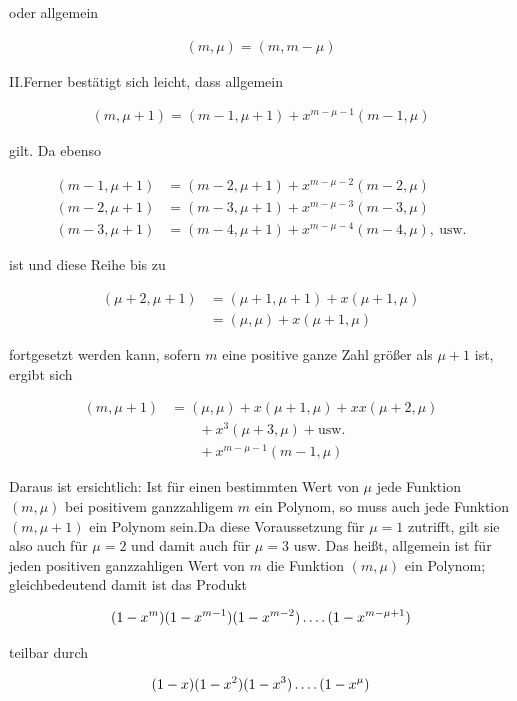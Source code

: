 oder allgemein

\[
\begin{aligned}
(m,\mu)=(m,m-\mu)
\end{aligned}
\]

II.\quad Ferner bestätigt sich leicht, dass allgemein

\[
\begin{aligned}
(m,\mu+1)=(m-1,\mu+1)+x^{m-\mu-1}(m-1,\mu)
\end{aligned}
\]

gilt. Da ebenso

\[
\begin{aligned}
(m-1,\mu+1)&=(m-2,\mu+1)+x^{m-\mu-2}(m-2,\mu)\\
(m-2,\mu+1)&=(m-3,\mu+1)+x^{m-\mu-3}(m-3,\mu)\\
(m-3,\mu+1)&=(m-4,\mu+1)+x^{m-\mu-4}(m-4,\mu),\ \text{usw.}
\end{aligned}
\]

ist und diese Reihe bis zu

\[
\begin{aligned}
(\mu+2,\mu+1)&=(\mu+1,\mu+1)+x(\mu+1,\mu)\\
&=(\mu,\mu)+x(\mu+1,\mu)
\end{aligned}
\]

fortgesetzt werden kann, sofern $m$ eine positive ganze Zahl größer als $\mu+1$ ist, ergibt sich

\[
\begin{aligned}
(m,\mu+1)&=(\mu,\mu)+x(\mu+1,\mu)+xx(\mu+2,\mu)\\
&\qquad+x^3(\mu+3,\mu)+\text{usw.}\\
&\qquad+x^{m-\mu-1}(m-1,\mu)
\end{aligned}
\]

Daraus ist ersichtlich: Ist für einen bestimmten Wert von $\mu$ jede Funktion $(m,\mu)$ bei positivem ganzzahligem $m$ ein Polynom, so muss auch jede Funktion $(m,\mu+1)$ ein Polynom sein.\quad Da diese Voraussetzung für $\mu=1$ zutrifft, gilt sie also auch für $\mu=2$ und damit auch für $\mu=3$ usw. Das heißt, allgemein ist für jeden positiven ganzzahligen Wert von $m$ die Funktion $(m,\mu)$ ein Polynom; gleichbedeutend damit ist das Produkt

\[
\begin{aligned}
(1-x^m)(1-x^{m-1})(1-x^{m-2})\mathinner{.\,.\,.\,.}(1-x^{m-\mu+1})
\end{aligned}
\]

teilbar durch

\[
\begin{aligned}
(1-x)(1-x^2)(1-x^3)\mathinner{.\,.\,.\,.}(1-x^\mu)
\end{aligned}
\]

